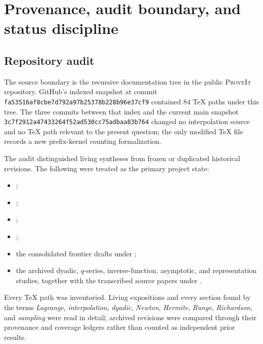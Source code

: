 \documentclass[11pt,oneside]{article}
\numberwithin{equation}{section}
\theoremstyle{definition}
\theoremstyle{remark}
\newcommand{\repo}{\textsc{ProveIt}}
\begin{document}
\tableofcontents
\clearpage

\section{Provenance, audit boundary, and status discipline}
\label{sec:provenance}

\subsection{Repository audit}

The source boundary is the recursive documentation tree
 in the public \repo{} repository.  GitHub's indexed
snapshot at commit
\texttt{fa53516af8cbe7d792a97b25378b228b96e37cf9} contained $84$ TeX paths under this
tree.  The three commits between that index and the current main snapshot
\texttt{3c7f2912a47433264f52ad530cc75adbaa83b764} changed no interpolation source and no
TeX path relevant to the present question; the only modified TeX file records a new
prefix-kernel counting formalization.

The audit distinguished living syntheses from frozen or duplicated historical revisions.
The following were treated as the primary project state:
\begin{itemize}
\item {};
\item {};
\item {};
\item {};
\item the consolidated frontier drafts under
      ;
\item the archived dyadic, $q$-series, inverse-function, asymptotic, and representation
      studies, together with the transcribed source papers under .
\end{itemize}
Every TeX path was inventoried.  Living expositions and every section found by the terms
\emph{Lagrange}, \emph{interpolation}, \emph{dyadic}, \emph{Newton}, \emph{Hermite},
\emph{Runge}, \emph{Richardson}, and \emph{sampling} were read in detail; archived
revisions were compared through their provenance and coverage ledgers rather than counted
as independent prior results.
\end{document}
